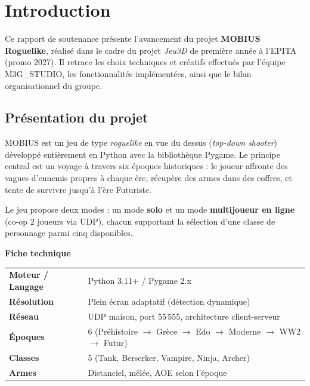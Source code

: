 \documentclass[12pt, a4paper]{report}
\begin{document}
\chapter{Introduction}

Ce rapport de soutenance pr\'{e}sente l'avancement du projet \textbf{MOBIUS Roguelike}, r\'{e}alis\'{e} dans le cadre du projet \textit{Jeu3D} de premi\`{e}re ann\'{e}e \`{a} l'EPITA (promo 2027). Il retrace les choix techniques et cr\'{e}atifs effectu\'{e}s par l'\'{e}quipe M3G\_STUDIO, les fonctionnalit\'{e}s impl\'{e}ment\'{e}es, ainsi que le bilan organisationnel du groupe.

\section{Pr\'{e}sentation du projet}

MOBIUS est un jeu de type \textit{roguelike} en vue du dessus (\textit{top-down shooter}) d\'{e}velopp\'{e} enti\`{e}rement en Python avec la biblioth\`{e}que Pygame. Le principe central est un voyage \`{a} travers six \'{e}poques historiques : le joueur affronte des vagues d'ennemis propres \`{a} chaque \`{e}re, r\'{e}cup\`{e}re des armes dans des coffres, et tente de survivre jusqu'\`{a} l'\`{e}re Futuriste.

Le jeu propose deux modes : un mode \textbf{solo} et un mode \textbf{multijoueur en ligne} (co-op 2 joueurs via UDP), chacun supportant la s\'{e}lection d'une classe de personnage parmi cinq disponibles.

\begin{infobox}
\textbf{Fiche technique}\\[4pt]
\begin{tabular}{ll}
  \textbf{Moteur / Langage} & Python 3.11+ / Pygame 2.x \\
  \textbf{R\'{e}solution}       & Plein \'{e}cran adaptatif (d\'{e}tection dynamique) \\
  \textbf{R\'{e}seau}           & UDP maison, port 55\,555, architecture client-serveur \\
  \textbf{\'{E}poques}          & 6 (Pr\'{e}histoire $\to$ Gr\`{e}ce $\to$ Edo $\to$ Moderne $\to$ WW2 $\to$ Futur) \\
  \textbf{Classes}          & 5 (Tank, Berserker, Vampire, Ninja, Archer) \\
  \textbf{Armes}            & Distanciel, m\^{e}l\'{e}e, AOE selon l'\'{e}poque \\
\end{tabular}
\end{infobox}
\end{document}

